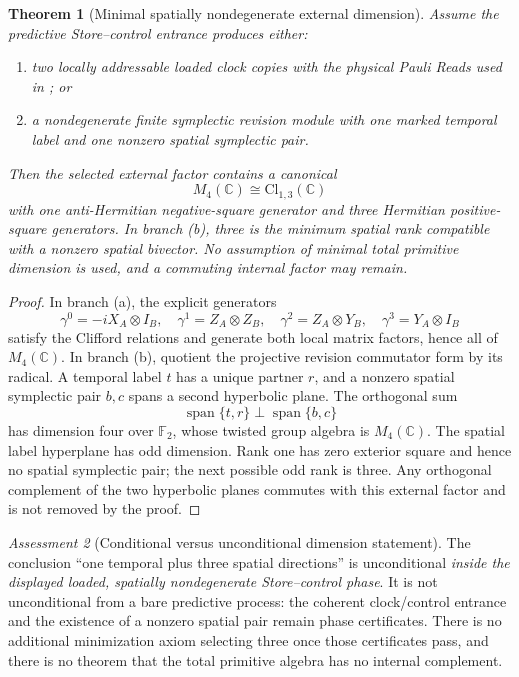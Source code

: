 \documentclass[11pt]{article}
\newtheorem{theorem}{Theorem}[section]
\theoremstyle{definition}
\theoremstyle{remark}
\newtheorem{assessment}[theorem]{Assessment}
\newcommand{\C}{\mathbb C}
\newcommand{\F}{\mathbb F}
\newcommand{\Cl}{\mathrm{Cl}}
\newcommand{\Span}{\operatorname{span}}
\begin{document}
\begin{theorem}[Minimal spatially nondegenerate external dimension]
\label{thm:master-dimension-status-v036}
Assume the predictive Store--control entrance produces either:
\begin{enumerate}[label=\textup{(\alph*)},leftmargin=2.7em]
\item two locally addressable loaded clock copies with the physical Pauli Reads
      used in ; or
\item a nondegenerate finite symplectic revision module with one marked
      temporal label and one nonzero spatial symplectic pair.
\end{enumerate}
Then the selected external factor contains a canonical
\[
 M_4(\C)\cong\Cl_{1,3}(\C)
\]
with one anti-Hermitian negative-square generator and three Hermitian
positive-square generators.  In branch \textup{(b)}, three is the minimum
spatial rank compatible with a nonzero spatial bivector.  No assumption of
minimal total primitive dimension is used, and a commuting internal factor may
remain.
\end{theorem}

\begin{proof}
In branch \textup{(a)}, the explicit generators
\[
 \gamma^0=-iX_A\otimes I_B,
 \quad
 \gamma^1=Z_A\otimes Z_B,
 \quad
 \gamma^2=Z_A\otimes Y_B,
 \quad
 \gamma^3=Y_A\otimes I_B
\]
satisfy the Clifford relations and generate both local matrix factors, hence
all of \(M_4(\C)\).  In branch \textup{(b)}, quotient the projective revision
commutator form by its radical.  A temporal label \(t\) has a unique partner
\(r\), and a nonzero spatial symplectic pair \(b,c\) spans a second hyperbolic
plane.  The orthogonal sum
\[
 \Span\{t,r\}\perp\Span\{b,c\}
\]
has dimension four over \(\F_2\), whose twisted group algebra is
\(M_4(\C)\).  The spatial label hyperplane has odd dimension.  Rank one has
zero exterior square and hence no spatial symplectic pair; the next possible
odd rank is three.  Any orthogonal complement of the two hyperbolic planes
commutes with this external factor and is not removed by the proof.
\end{proof}

\begin{assessment}[Conditional versus unconditional dimension statement]
The conclusion ``one temporal plus three spatial directions'' is unconditional
\emph{inside the displayed loaded, spatially nondegenerate Store--control
phase}.  It is not unconditional from a bare predictive process: the coherent
clock/control entrance and the existence of a nonzero spatial pair remain
phase certificates.  There is no additional minimization axiom selecting
three once those certificates pass, and there is no theorem that the total
primitive algebra has no internal complement.
\end{assessment}
\end{document}
